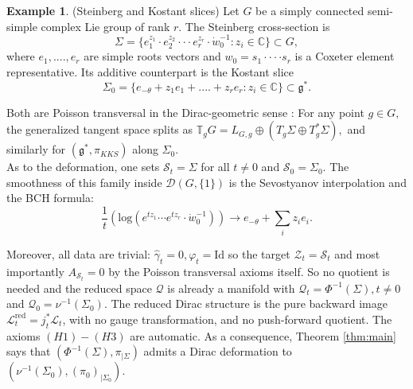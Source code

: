 \documentclass[reqno]{amsart}
\theoremstyle{plain}
\theoremstyle{definition}
\newtheorem{Exp}[Thm]{Example}
\newcommand{\g}{\mathfrak{g}}
\newcommand{\too}{\longrightarrow}
\renewcommand{\S}{\mathcal{S}}
\renewcommand{\L}{\mathcal{L}}
\newcommand{\Z}{\mathcal{Z}}
\newcommand{\D}{\mathcal{D}}
\newcommand{\Q}{\mathcal{Q}}
\begin{document}
\begin{Exp}(Steinberg and Kostant slices)
Let $G$ be a simply connected semi-simple complex Lie group of rank $r.$ The Steinberg cross-section is \[
\Sigma = \{e_1^{z_1}\cdot e_2^{z_2} \cdot \cdot \cdot e_{r}^{z_r}\cdot \dot{w}_0^{-1}: z_i \in \mathbb{C}\} \subset G,
\]
where $e_1,....,e_r$ are simple roots vectors and $w_0 = s_1\cdot \cdot \cdot \cdot s_r$ is a Coxeter element representative. Its additive counterpart is the Kostant slice \[
\Sigma_0 = \{e_{-\theta} + z_{1}e_{1} +....+ z_{r}e_r: z_i \in \mathbb{C}\} \subset \g^{*}.
\]

Both are Poisson transversal in the Dirac-geometric sense \cite[]{bursztyn2007dirac}: For any point $g\in G,$ the generalized tangent space splits as $\mathbb{T}_{g}G = L_{G,g} \oplus (T_{g}\Sigma \oplus T_{g}^{*}\Sigma),$ and similarly for $(\g^{*},\pi_{KKS})$ along $\Sigma_0.$ \\

As to the deformation, one sets $\S_t = \Sigma$ for all $t\neq 0$ and $\S_0 = \Sigma_0.$ The smoothness of this family inside $\D(G,\{1\})$ is the Sevostyanov interpolation \cite{sevostyanov2011algebraic} and the BCH formula: \[
\dfrac{1}{t}(\text{log}(e^{tz_1}\cdots e^{tz_r}\cdot \dot{w}_{0}^{-1})) \too e_{-\theta}  + \sum_{i} z_ie_i.
\]

Moreover, all data are trivial: $\widehat{\gamma}_t = 0, \varphi_t = \mathrm{Id}$ so the target $\Z_t = \S_t$ and most importantly $A_{\S_t} = 0$ by the Poisson transversal axioms itself. So no quotient is needed and the reduced space $\Q$ is already a manifold with $\Q_t = \Phi^{-1}(\Sigma), t\neq 0$ and $\Q_0 = \nu^{-1}(\Sigma_0).$ The reduced Dirac structure is the pure backward image $\L^{\text{red}}_t = j_{t}^{*}\L_t$, with no gauge transformation, and no push-forward quotient. The axioms $(H1)-(H3)$ are automatic. As a consequence, Theorem \ref{thm:main} says that $(\Phi^{-1}(\Sigma),\pi_{|\Sigma})$ admits a Dirac deformation to $(\nu^{-1}(\Sigma_0),(\pi_{0})_{|\Sigma_0}).$ 
\end{Exp}
\end{document}
